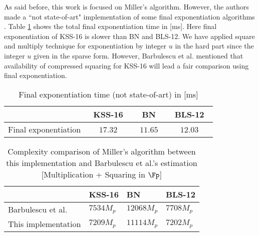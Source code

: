 As said before, this work is focused on Miller's algorithm. However, the authors made a ``not state-of-art" implementation of some  final exponentiation algorithms \cite{EPRINT:GhaFou16b,SAC:FueKnaRod11,loubna_bls12}. 
Table \ref{com_fe} shows the total final exponentiation time in [ms].
Here final exponentiation of KSS-16 is slower than BN and BLS-12.  
We have applied square and multiply technique for exponentiation by integer $u$ in the hard part since the integer $u$ given in the sparse form.
However, Barbulescu et al. \cite{sylvain_new_param} mentioned that availability of compressed squaring \cite{EC:AKLGL11} for KSS-16 will lead a fair comparison using final exponentiation.
\renewcommand{\baselinestretch}{1.5}
\begin{table}[!h]
\centering
\caption{Final exponentiation time (not state-of-art) in [ms] }
\label{com_fe}
\begin{tabular}{l|c|c|c|}
\cline{2-4}
                                           & ~KSS-16~   & ~BN~       & ~BLS-12~   \\ \hline
\multicolumn{1}{|l|}{Final exponentiation} & ~$17.32 $~ & ~$11.65 $~ & ~$12.03 $~ \\ \hline
\end{tabular}
\end{table}
\renewcommand{\baselinestretch}{1.0}

\renewcommand{\baselinestretch}{1.5}
\begin{table}[!h]
	\centering
	\caption{Complexity comparison of Miller's algorithm between this implementation and Barbulescu et al.'s \cite{sylvain_new_param} estimation [Multiplication + Squaring in $\Fp$]}
	\label{com_com}
	\begin{tabular}{l|l|l|l|}
		\cline{2-4}
		& KSS-16     & BN          & BLS-12      \\ \hline
		\multicolumn{1}{|l|}{Barbulescu et al. \cite{sylvain_new_param}} & $ 7534 M_p$ & $12068 M_p$ & $7708 M_p$ \\ \hline
		\multicolumn{1}{|l|}{This implementation}         &     $7209 M_p$       &   $11114 M_p$          &        $7202 M_p$   \\ \hline
	\end{tabular}
\end{table}
\renewcommand{\baselinestretch}{1.0}

